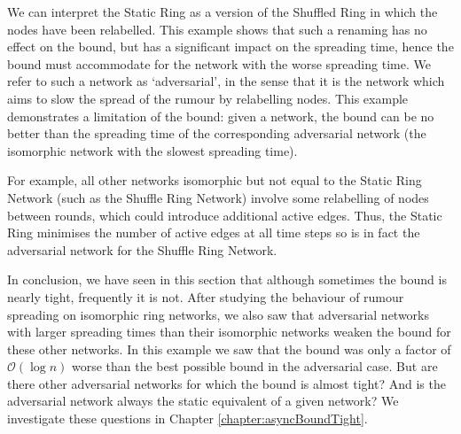 We can interpret the Static Ring as a version of the Shuffled Ring in which the nodes have been relabelled. This example shows that such a renaming has no effect on the bound, but has a significant impact on the spreading time, hence the bound must accommodate for the network with the worse spreading time. We refer to such a network as `adversarial', in the sense that it is the network which aims to slow the spread of the rumour by relabelling nodes. This example demonstrates a limitation of the bound: given a network, the bound can be no better than the spreading time of the corresponding adversarial network (the isomorphic network with the slowest spreading time).

For example, all other networks isomorphic but not equal to the Static Ring Network (such as the Shuffle Ring Network) involve some relabelling of nodes between rounds, which could introduce additional active edges. Thus, the Static Ring minimises the number of active edges at all time steps so is in fact the adversarial network for the Shuffle Ring Network. 

In conclusion, we have seen in this section that although sometimes the bound is nearly tight, frequently it is not. After studying the behaviour of rumour spreading on isomorphic ring networks, we also saw that adversarial networks with larger spreading times than their isomorphic networks weaken the bound for these other networks. In this example we saw that the bound was only a factor of $\mathcal{O}(\log n)$ worse than the best possible bound in the adversarial case. But are there other adversarial networks for which the bound is almost tight? And is the adversarial network always the static equivalent of a given network? We investigate these questions in Chapter \ref{chapter:asyncBoundTight}.